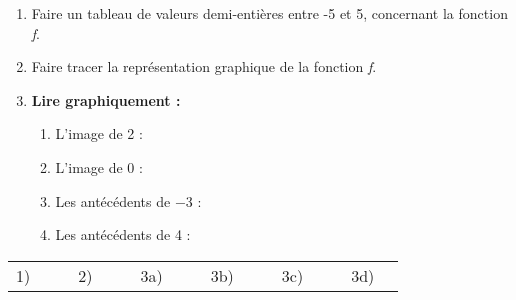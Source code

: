 \documentclass[12pt,a4paper]{article}
\begin{document}
\begin{enumerate} [1{)}]
\item
Faire un tableau de valeurs demi-entières entre -5 et 5, concernant la fonction \textit{f}.
\item
Faire tracer la représentation graphique de la fonction \textit{f}.
\item
\textbf{Lire graphiquement :} \vspace{6pt}
\begin{enumerate} [a{)}]
\item
L'image de 2 : \dotfill \vspace{6pt}
\item
L'image de 0 : \dotfill \vspace{6pt}
\item
Les antécédents de $-$3 : \dotfill \vspace{6pt}
\item
Les antécédents de 4 : \dotfill \\
\end{enumerate}
\end{enumerate}
\renewcommand{\arraystretch}{2}
\begin{tabular}{l|p{5mm}|p{0.5cm}l|p{5mm}|p{0.5cm}l|p{5mm}|p{0.5cm}l|p{5mm}|p{0.5cm}l|p{5mm}|p{0.5cm}l|p{5mm}|}
\cline{2-2} \cline{5-5} \cline{8-8} \cline{11-11} \cline{14-14} \cline{17-17}
1)&&&2)&&&3a)&&&3b)&&&3c)&&&3d)&\\
\cline{2-2} \cline{5-5} \cline{8-8} \cline{11-11} \cline{14-14} \cline{17-17}
\end{tabular} 
\end{document}
